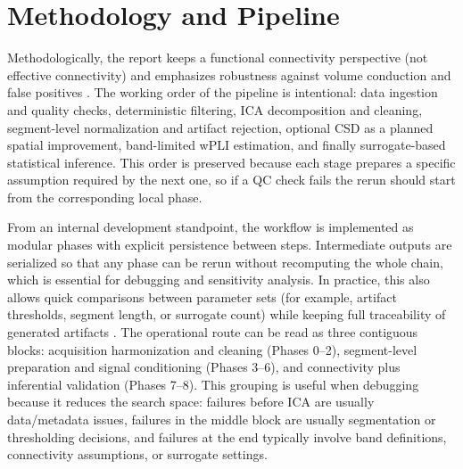 \section{Methodology and Pipeline}

Methodologically, the report keeps a functional connectivity perspective (not effective connectivity) and emphasizes robustness against volume conduction and false positives \citep{Cohen2014,Vinck2011WPLI,Cao2022EEGConnectivity}. The working order of the pipeline is intentional: data ingestion and quality checks, deterministic filtering, ICA decomposition and cleaning, segment-level normalization and artifact rejection, optional CSD as a planned spatial improvement, band-limited wPLI estimation, and finally surrogate-based statistical inference. This order is preserved because each stage prepares a specific assumption required by the next one, so if a QC check fails the rerun should start from the corresponding local phase.

From an internal development standpoint, the workflow is implemented as modular phases with explicit persistence between steps. Intermediate outputs are serialized so that any phase can be rerun without recomputing the whole chain, which is essential for debugging and sensitivity analysis. In practice, this also allows quick comparisons between parameter sets (for example, artifact thresholds, segment length, or surrogate count) while keeping full traceability of generated artifacts \citep{Blinowska-Cieslak2022,Sanei2022}.
The operational route can be read as three contiguous blocks: acquisition harmonization and cleaning (Phases 0--2), segment-level preparation and signal conditioning (Phases 3--6), and connectivity plus inferential validation (Phases 7--8). This grouping is useful when debugging because it reduces the search space: failures before ICA are usually data/metadata issues, failures in the middle block are usually segmentation or thresholding decisions, and failures at the end typically involve band definitions, connectivity assumptions, or surrogate settings.

